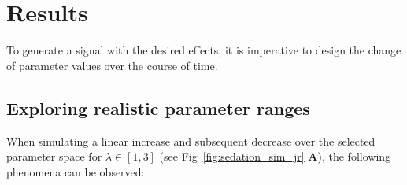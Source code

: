 \chapter{Results}\label{ch:results}
To generate a signal with the desired effects, it is imperative to design the change of parameter values over the
course of time.
%
%
%
%
%
%
\section{Exploring realistic parameter ranges}\label{sec:simulation-over-the-parameter-space}

When simulating a linear increase and subsequent decrease over the selected parameter space for
$ \lambda \in \left[ 1, 3 \right] $ (see Fig~\ref{fig:sedation_sim_jr} \textbf{A}),
the following phenomena can be observed:

\newtoggle{drawLocRoc}

